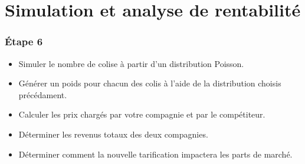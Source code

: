 \section{Simulation et analyse de rentabilité}
\begin{frame}[fragile=singleslide]
  \frametitle{Étape 6}

\begin{itemize}
\item Simuler le nombre de colise à partir d'un distribution Poisson.
\item Générer un poids pour chacun des colis à l'aide de la distribution choisis précédament.
\item Calculer les prix chargés par votre compagnie et par le compétiteur.
\item Déterminer les revenus totaux des deux compagnies.
\item Déterminer comment la nouvelle tarification impactera les parts de marché.
\end{itemize}
\end{frame}

